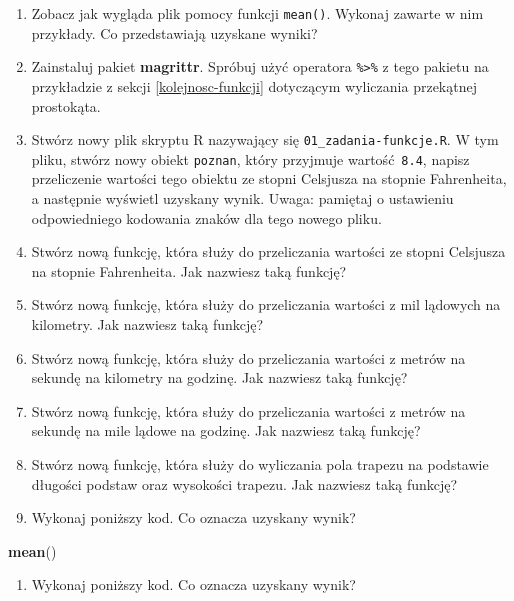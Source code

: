 \documentclass[paper=6in:9in,pagesize=pdftex,headinclude=on,footinclude=on,10pt]{scrbook}
\newenvironment{Shaded}{\begin{snugshade}}{\end{snugshade}}
\newcommand{\KeywordTok}[1]{\textcolor[rgb]{0.13,0.29,0.53}{\textbf{#1}}}
\newcommand{\NormalTok}[1]{#1}
\providecommand{\tightlist}{%
  \setlength{\itemsep}{0pt}\setlength{\parskip}{0pt}}
\begin{document}
\begin{enumerate}
\def\labelenumi{\arabic{enumi})}
\tightlist
\item
  Zobacz jak wygląda plik pomocy funkcji \texttt{mean()}.
  Wykonaj zawarte w nim przykłady.
  Co przedstawiają uzyskane wyniki?
\item
  Zainstaluj pakiet \textbf{magrittr}.
  Spróbuj użyć operatora \texttt{\%\textgreater{}\%} z tego pakietu na przykładzie z sekcji \ref{kolejnosc-funkcji} dotyczącym wyliczania przekątnej prostokąta.
\item
  Stwórz nowy plik skryptu R nazywający się \texttt{01\_zadania-funkcje.R}.
  W tym pliku, stwórz nowy obiekt \texttt{poznan}, który przyjmuje wartość~\texttt{8.4}, napisz przeliczenie wartości tego obiektu ze stopni Celsjusza na stopnie Fahrenheita, a następnie wyświetl uzyskany wynik.
  Uwaga: pamiętaj o ustawieniu odpowiedniego kodowania znaków dla tego nowego pliku.
\item
  Stwórz nową funkcję, która służy do przeliczania wartości ze stopni Celsjusza na stopnie Fahrenheita.
  Jak nazwiesz taką funkcję?
\item
  Stwórz nową funkcję, która służy do przeliczania wartości z mil lądowych na kilometry.
  Jak nazwiesz taką funkcję?
\item
  Stwórz nową funkcję, która służy do przeliczania wartości z metrów na sekundę na kilometry na godzinę.
  Jak nazwiesz taką funkcję?
\item
  Stwórz nową funkcję, która służy do przeliczania wartości z metrów na sekundę na mile lądowe na godzinę.
  Jak nazwiesz taką funkcję?
\item
  Stwórz nową funkcję, która służy do wyliczania pola trapezu na podstawie długości podstaw oraz wysokości trapezu.
  Jak nazwiesz taką funkcję?
\item
  Wykonaj poniższy kod.
  Co oznacza uzyskany wynik?
\end{enumerate}

\begin{Shaded}
\begin{Highlighting}[]
\KeywordTok{mean}\NormalTok{()}
\end{Highlighting}
\end{Shaded}

\begin{enumerate}
\def\labelenumi{\arabic{enumi})}
\setcounter{enumi}{9}
\tightlist
\item
  Wykonaj poniższy kod.
  Co oznacza uzyskany wynik?
\end{enumerate}
\end{document}
